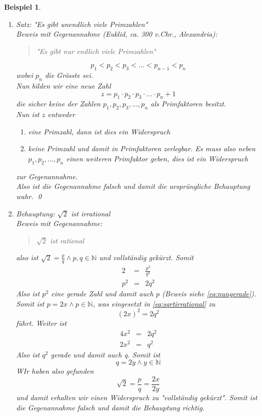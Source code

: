 \documentclass{report}
\newtheorem{myexample}{Beispiel}
\begin{document}
\begin{myexample}\begin{enumerate}
\item Satz: "Es gibt unendlich viele Primzahlen"\\
Beweis mit Gegenannahme (Euklid, ca. 300 v.Chr., Alexandria):
\begin{quote}"Es gibt nur endlich viele Primzahlen"\end{quote}
\begin{equation}p_1 < p_2 < p_3 < ... < p_{n-1} < p_n\end{equation}
wobei $p_n$ die Grösste sei.\\
Nun bilden wir eine neue Zahl
\begin{equation}z = p_1 \cdot p_2 \cdot p_3 \cdot ... \cdot p_n + 1\end{equation}
die sicher keine der Zahlen $p_1, p_2, p_3, ..., p_n$ als Primfaktoren besitzt.\\
Nun ist $z$ entweder
\begin{enumerate}\item eine Primzahl, dann ist dies ein Widerspruch
\item keine Primzahl und damit in Primfaktoren zerlegbar. Es muss also neben $p_1, p_2, ..., p_n$ einen weiteren Primfaktor geben, dies ist ein Widerspruch\end{enumerate}
zur Gegenannahme.\\
Also ist die Gegenannahme falsch und damit die ursprüngliche Behauptung wahr. \qed

\item Behauptung: $\sqrt{2}$ ist irrational\\
Beweis mit Gegenannahme:
\begin{quote}$\sqrt{2}$ ist rational\end{quote}
also ist $\sqrt{2} = \frac{p}{q} \land p, q \in \mathbb{N}$ und vollständig gekürzt. Somit
\begin{eqnarray}2&=&\frac{p^2}{q^2} \nonumber \\
p^2&=&2q^2 \label{eq:sqrtirrational} \end{eqnarray}
Also ist $p^2$ eine gerade Zahl und damit auch $p$ (Beweis siehe \ref{eq:nungerade}). Somit ist $p = 2x \land p \in \mathbb{N}$, was eingesetzt in \ref{eq:sqrtirrational} zu
\begin{equation}(2x)^2 = 2q^2\end{equation}
führt. Weiter ist
\begin{eqnarray}4x^2&=&2q^2 \nonumber \\
2x^2&=&q^2\end{eqnarray}
Also ist $q^2$ gerade und damit auch q. Somit ist
\begin{equation}q = 2y \land y \in \mathbb{N}\end{equation}
WIr haben also gefunden
\begin{equation}\sqrt{2} = \frac{p}{q} = \frac{2x}{2y}\end{equation}
und damit erhalten wir einen Widerspruch zu "vollständig gekürzt". Somit ist die Gegenannahme falsch und damit die Behauptung richtig.
\end{enumerate}\end{myexample}
\end{document}
